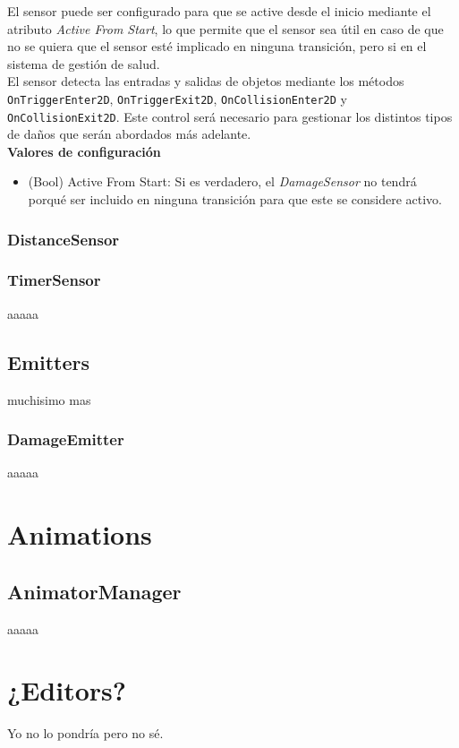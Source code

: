 El sensor puede ser configurado para que se active desde el inicio mediante el atributo \textit{Active From Start}, lo que permite que el sensor sea útil en caso de que no se quiera que el sensor esté implicado en ninguna transición, pero si en el sistema de gestión de salud.\\


El sensor detecta las entradas y salidas de objetos mediante los métodos \texttt{OnTriggerEnter2D}, \texttt{OnTriggerExit2D}, \texttt{OnCollisionEnter2D} y \texttt{OnCollisionExit2D}. Este control será necesario para gestionar los distintos tipos de daños que serán abordados más adelante.\\

\textbf{Valores de configuración}
\begin{itemize}
	\item (Bool) Active From Start: Si es verdadero, el \textit{DamageSensor} no tendrá porqué ser incluido en ninguna transición para que este se considere activo.
\end{itemize}

\subsubsection{DistanceSensor}

\subsubsection{TimerSensor}
aaaaa

\subsection{Emitters}
muchisimo mas
\subsubsection{DamageEmitter}
aaaaa

\section{Animations}
\subsection{AnimatorManager}
aaaaa

\section{¿Editors?}
Yo no lo pondría pero no sé.

